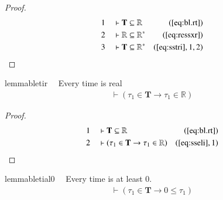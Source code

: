 \begin{proof}
\begin{align}
  1 &&  & \vdash \mathbf{T} \subseteq \mathbb{R}&(\mbox{\ref{eq:bl.rt}})\notag
  \\ 2 &&  & \vdash \mathbb{R} \subseteq
      \mathbb{R}^{\ast}&(\mbox{\ref{eq:ressxr}})\notag
  \\ 3 &&  & \vdash \mathbf{T} \subseteq
      \mathbb{R}^{\ast}&(\mbox{\ref{eq:sstri}},1,2)\notag
\end{align}
\end{proof}

\begin{restatable}{lemma}{bletir}~~ Every time is real
\begin{align}
\vdash ( \tau_1 \in \mathbf{T} \rightarrow \tau_1 \in \mathbb{R}
    )\label{eq:bl.etir}\tag{bl.etir}
\end{align}
\end{restatable}

\begin{proof}
\begin{align}
  1 &&  & \vdash \mathbf{T} \subseteq \mathbb{R}&(\mbox{\ref{eq:bl.rt}})\notag
  \\ 2 &&  & \vdash ( \tau_1 \in \mathbf{T} \rightarrow \tau_1 \in \mathbb{R}
      )&(\mbox{\ref{eq:sseli}},1)\notag
\end{align}
\end{proof}

\begin{restatable}{lemma}{bletial0}~~ Every time is at least 0.
\begin{align}
\vdash ( \tau_1 \in \mathbf{T} \rightarrow 0 \le \tau_1
    )\label{eq:bl.etial0}\tag{bl.etial0}
\end{align}
\end{restatable}

